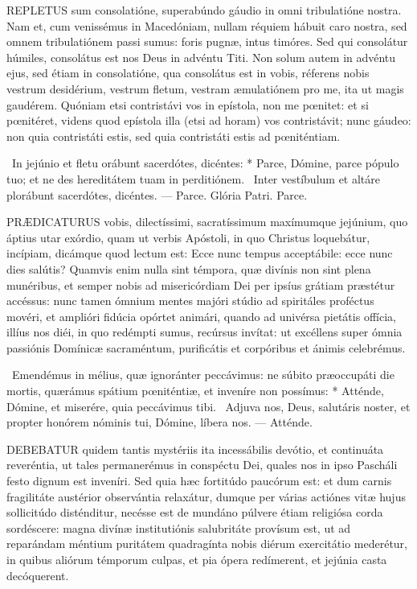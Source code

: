 
\lettrine[lines=2]{R}{EPLETUS} sum consolatióne, superabúndo gáudio in omni tribulatióne nostra. Nam et, cum venissémus in Macedóniam, nullam réquiem hábuit caro nostra, sed omnem tribulatiónem passi sumus: foris pugnæ, intus timóres. Sed qui consolátur húmiles, consolátus est nos Deus in advéntu Titi. Non solum autem in advéntu ejus, sed étiam in consolatióne, qua consolátus est in vobis, réferens nobis vestrum desidérium, vestrum fletum, vestram æmulatiónem pro me, ita ut magis gaudérem. Quóniam etsi contristávi vos in epístola, non me pœnitet: et si pœnitéret, videns quod epístola illa (etsi ad horam) vos contristávit; nunc gáudeo: non quia contristáti estis, sed quia contristáti estis ad pœniténtiam.

\R\ In jejúnio et fletu orábunt sacerdótes, dicéntes: * Parce, Dómine, parce pópulo tuo; et ne des hereditátem tuam in perditiónem. \V\ Inter vestíbulum et altáre plorábunt sacerdótes, dicéntes. --- Parce. Glória Patri. Parce.





\lettrine[lines=2]{P}{RÆDICATURUS} vobis, dilectíssimi, sacratíssimum maxímumque jejúnium, quo áptius utar exórdio, quam ut verbis Apóstoli, in quo Christus loquebátur, incípiam, dicámque quod lectum est: Ecce nunc tempus acceptábile: ecce nunc dies salútis? Quamvis enim nulla sint témpora, quæ divínis non sint plena munéribus, et semper nobis ad misericórdiam Dei per ipsíus grátiam præstétur accéssus: nunc tamen ómnium mentes majóri stúdio ad spiritáles proféctus movéri, et amplióri fidúcia opórtet animári, quando ad univérsa pietátis offícia, illíus nos diéi, in quo redémpti sumus, recúrsus invítat: ut excéllens super ómnia passiónis Domínicæ sacraméntum, purificátis et corpóribus et ánimis celebrémus.

\R\ Emendémus in mélius, quæ ignoránter peccávimus: ne súbito præoccupáti die mortis, quærámus spátium pœniténtiæ, et inveníre non possímus: * Atténde, Dómine, et miserére, quia peccávimus tibi. \V\ Adjuva nos, Deus, salutáris noster, et propter honórem nóminis tui, Dómine, líbera nos. --- Atténde.


\lettrine[lines=2]{D}{EBEBATUR} quidem tantis mystériis ita incessábilis devótio, et continuáta reveréntia, ut tales permanerémus in conspéctu Dei, quales nos in ipso Pascháli festo dignum est inveníri. Sed quia hæc fortitúdo paucórum est: et dum carnis fragilitáte austérior observántia relaxátur, dumque per várias actiónes vitæ hujus sollicitúdo disténditur, necésse est de mundáno púlvere étiam religiósa corda sordéscere: magna divínæ institutiónis salubritáte provísum est, ut ad reparándam méntium puritátem quadragínta nobis diérum exercitátio mederétur, in quibus aliórum témporum culpas, et pia ópera redímerent, et jejúnia casta decóquerent.

